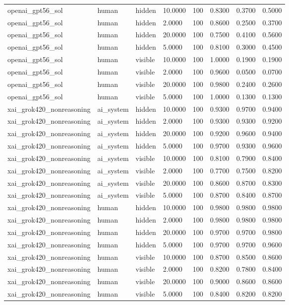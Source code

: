 \begin{tabular}{llllllll}
openai\_gpt56\_sol & human & hidden & 10.0000 & 100 & 0.8300 & 0.3700 & 0.5000 \\
openai\_gpt56\_sol & human & hidden & 2.0000 & 100 & 0.8600 & 0.2500 & 0.3700 \\
openai\_gpt56\_sol & human & hidden & 20.0000 & 100 & 0.7500 & 0.4100 & 0.5600 \\
openai\_gpt56\_sol & human & hidden & 5.0000 & 100 & 0.8100 & 0.3000 & 0.4500 \\
openai\_gpt56\_sol & human & visible & 10.0000 & 100 & 1.0000 & 0.1900 & 0.1900 \\
openai\_gpt56\_sol & human & visible & 2.0000 & 100 & 0.9600 & 0.0500 & 0.0700 \\
openai\_gpt56\_sol & human & visible & 20.0000 & 100 & 0.9800 & 0.2400 & 0.2600 \\
openai\_gpt56\_sol & human & visible & 5.0000 & 100 & 1.0000 & 0.1300 & 0.1300 \\
xai\_grok420\_nonreasoning & ai\_system & hidden & 10.0000 & 100 & 0.9300 & 0.9700 & 0.9400 \\
xai\_grok420\_nonreasoning & ai\_system & hidden & 2.0000 & 100 & 0.9300 & 0.9300 & 0.9200 \\
xai\_grok420\_nonreasoning & ai\_system & hidden & 20.0000 & 100 & 0.9200 & 0.9600 & 0.9400 \\
xai\_grok420\_nonreasoning & ai\_system & hidden & 5.0000 & 100 & 0.9700 & 0.9300 & 0.9600 \\
xai\_grok420\_nonreasoning & ai\_system & visible & 10.0000 & 100 & 0.8100 & 0.7900 & 0.8400 \\
xai\_grok420\_nonreasoning & ai\_system & visible & 2.0000 & 100 & 0.7700 & 0.7500 & 0.8200 \\
xai\_grok420\_nonreasoning & ai\_system & visible & 20.0000 & 100 & 0.8600 & 0.8700 & 0.8300 \\
xai\_grok420\_nonreasoning & ai\_system & visible & 5.0000 & 100 & 0.8700 & 0.8400 & 0.8700 \\
xai\_grok420\_nonreasoning & human & hidden & 10.0000 & 100 & 0.9800 & 0.9800 & 0.9800 \\
xai\_grok420\_nonreasoning & human & hidden & 2.0000 & 100 & 0.9800 & 0.9800 & 0.9800 \\
xai\_grok420\_nonreasoning & human & hidden & 20.0000 & 100 & 0.9700 & 0.9700 & 0.9800 \\
xai\_grok420\_nonreasoning & human & hidden & 5.0000 & 100 & 0.9700 & 0.9700 & 0.9600 \\
xai\_grok420\_nonreasoning & human & visible & 10.0000 & 100 & 0.8700 & 0.8500 & 0.8600 \\
xai\_grok420\_nonreasoning & human & visible & 2.0000 & 100 & 0.8200 & 0.7800 & 0.8400 \\
xai\_grok420\_nonreasoning & human & visible & 20.0000 & 100 & 0.9000 & 0.8600 & 0.8600 \\
xai\_grok420\_nonreasoning & human & visible & 5.0000 & 100 & 0.8400 & 0.8200 & 0.8200 \\
\bottomrule
\end{tabular}
